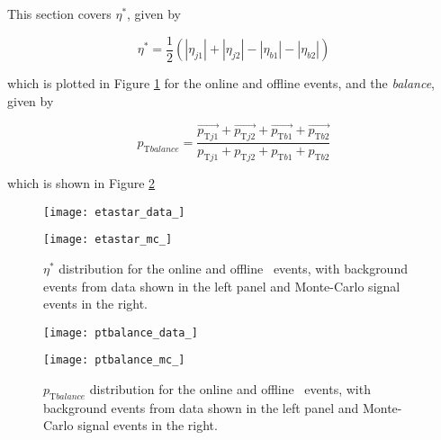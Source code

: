     This section covers $\eta^*$, given by

    \begin{equation}
    \eta^* = \frac{1}{2}(|\eta_{j1}| + |\eta_{j2}| - |\eta_{b1}| - |\eta_{b2}|)
    \end{equation}

    which is plotted in Figure \ref{f:etastar} for the online and offline events, and the \pt \textit{balance}, given by

    \begin{equation}
        p_{\text{T} balance} = \frac{\vec{p_{\text{T}j1}} + \vec{p_{\text{T}j2}} + \vec{p_{\text{T}b1}} + \vec{p_{\text{T}b2}}}{p_{\text{T}j1} + p_{\text{T}j2} + p_{\text{T}b1} + p_{\text{T}b2}}
    \end{equation}

    which is shown in Figure \ref{f:ptbalance}

    \begin{figure}[h]
        \centering
        \begin{minipage}[h]{0.48\linewidth}
            \texttt{[image: etastar\_data\_]}
        \end{minipage}
        \quad
        \begin{minipage}[h]{0.48\linewidth}
            \texttt{[image: etastar\_mc\_]}
        \end{minipage}
        \caption[Comparison of the $\eta^*$ distribution of the \VBFHBB\ events for HLT and offline objects]{$\eta^*$ distribution for the online and offline \VBFHBB\ events, with background events from data shown in the left panel and Monte-Carlo signal events in the right.}
        \label{f:etastar}
    \end{figure}

    \begin{figure}[h]
        \centering
        \begin{minipage}[h]{0.48\linewidth}
            \texttt{[image: ptbalance\_data\_]}
        \end{minipage}
        \quad
        \begin{minipage}[h]{0.48\linewidth}
            \texttt{[image: ptbalance\_mc\_]}
        \end{minipage}
        \caption[Comparison of the $p_{\text{T} balance}$ distribution of the \VBFHBB\ events for HLT and offline objects]{$p_{\text{T} balance}$ distribution for the online and offline \VBFHBB\ events, with background events from data shown in the left panel and Monte-Carlo signal events in the right.}
        \label{f:ptbalance}
    \end{figure}

